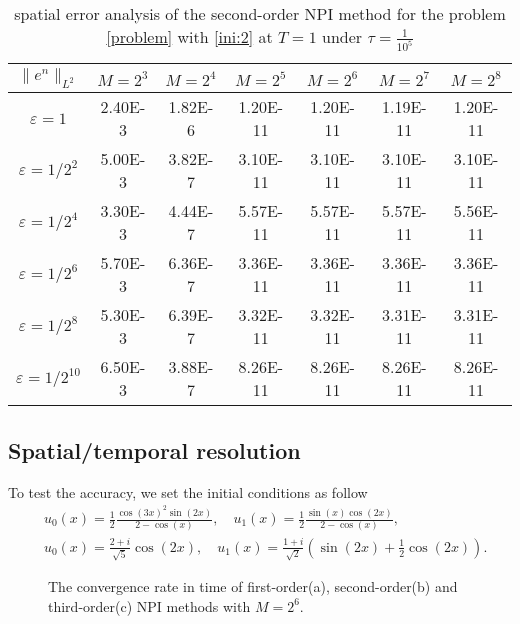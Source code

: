 \documentclass[final,leqno,showlabe]{siamltex}
\begin{document}
\begin{table}[tbhp]
{\footnotesize
  \caption{spatial error analysis of the second-order NPI method for the problem \eqref{problem} with \eqref{ini:2} at $T=1$ under $\tau=\frac{1}{10^5}$}\label{tab:spatialfour}
\begin{center}
\begin{tabular}{|c|c|c|c|c|c|c|}
     \hline
     $\|e^n\|_{L^2}$ &$M=2^3$ &$M=2^4$ &$M=2^5$& $M=2^6$&$M=2^7$&$M=2^8$\\
     \hline
    $\varepsilon=1$&      2.40E-3 &  1.82E-6   & 1.20E-11 &  1.20E-11 &  1.19E-11& 1.20E-11\\
     $\varepsilon=1/2^2$& 5.00E-3 & 3.82E-7  & 3.10E-11  & 3.10E-11  & 3.10E-11  & 3.10E-11  \\
     $\varepsilon=1/2^4$& 3.30E-3 & 4.44E-7  & 5.57E-11  & 5.57E-11  & 5.57E-11 & 5.56E-11\\
     $\varepsilon=1/2^6$& 5.70E-3& 6.36E-7 & 3.36E-11   & 3.36E-11  & 3.36E-11 & 3.36E-11   \\
     $\varepsilon=1/2^8$& 5.30E-3& 6.39E-7 & 3.32E-11   & 3.32E-11  & 3.31E-11 & 3.31E-11   \\
     $\varepsilon=1/2^{10}$& 6.50E-3& 3.88E-7 & 8.26E-11   & 8.26E-11  & 8.26E-11 & 8.26E-11   \\
     \hline
\end{tabular}
\end{center}
}
\end{table}


\subsection{Spatial/temporal resolution} To test the accuracy, we set the initial conditions as follow
\begin{eqnarray}
&u_0(x)=\frac{1}{2}\frac{\cos(3x)^2\sin(2x)}{2-\cos(x)}, \quad u_1(x)=\frac{1}{2}\frac{\sin(x)\cos(2x)}{2-\cos(x)},\label{ini:1}\\
&u_0(x)=\frac{2+i}{\sqrt{5}}\cos(2x), \quad u_1(x)=\frac{1+i}{\sqrt{2}}(\sin(2x)+\frac{1}{2}\cos(2x)).\label{ini:2}
\end{eqnarray}


\begin{figure}[tbhp]%
  \centering

  \centering
  \caption{The convergence rate in time of first-order(a), second-order(b) and third-order(c) NPI methods  with $M=2^6$.}
\label{fig:testfig1}
\end{figure}
\end{document}
